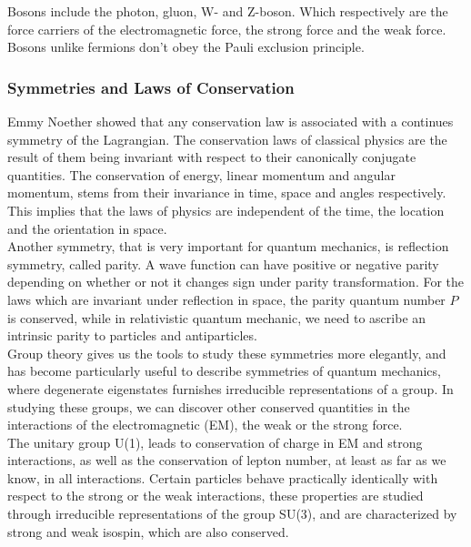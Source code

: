 \documentclass[11pt,a4paper]{article}
\begin{document}
Bosons include the photon, gluon, W- and Z-boson. Which respectively are the
force carriers of the electromagnetic force, the strong force and the weak
force. Bosons unlike fermions don't obey the Pauli exclusion principle.

\subsubsection{Symmetries and Laws of Conservation} Emmy Noether showed that any
conservation law is associated with a continues symmetry of the Lagrangian. The
conservation laws of classical physics are the result of them being invariant
with respect to their canonically conjugate quantities. The conservation of
energy, linear momentum and angular momentum, stems from their invariance in
time, space and angles respectively. This implies that the laws of physics are
independent of the time, the location and the orientation in space.\\

Another symmetry, that is very important for quantum mechanics, is reflection
symmetry, called parity. A wave function can have positive or negative parity
depending on whether or not it changes sign under parity transformation. For the
laws which are invariant under reflection in space, the parity quantum number
$P$ is conserved, while in relativistic quantum mechanic, we need to ascribe an
intrinsic parity to particles and antiparticles.\\

Group theory gives us the tools to study these symmetries more elegantly, and
has become particularly useful to describe symmetries of quantum mechanics,
where degenerate eigenstates furnishes irreducible representations of a group.
In studying these groups, we can discover other conserved quantities in the
interactions of the electromagnetic (EM), the weak or the strong force. \\

The unitary group U(1), leads to conservation of charge in EM and strong
interactions, as well as the conservation of lepton number, at least as far as
we know, in all interactions. Certain particles behave practically identically
with respect to the strong or the weak interactions, these properties are
studied through irreducible representations of the group SU(3), and are
characterized by strong and weak isospin, which are also conserved.
\end{document}
